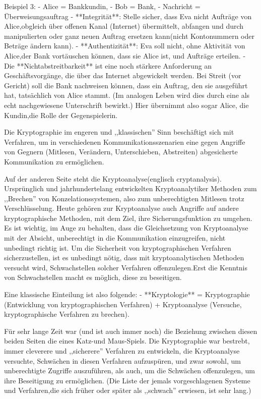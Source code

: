 \documentclass[a4paper]{article}
\begin{document}
\begin{multicols}{3}
    Beispiel 3:
    - Alice = Bankkundin,
    - Bob = Bank,
    - Nachricht = Überweisungsauftrag
    - **Integrität**: Stelle sicher, dass Eva nicht Aufträge von Alice,obgleich über offenen Kanal (Internet) übermittelt, abfangen und durch manipulierten oder ganz neuen Auftrag ersetzen kann(nicht Kontonummern oder Beträge ändern kann).
    - **Authentizität**: Eva soll nicht, ohne Aktivität von Alice,der Bank vortäuschen können, dass sie Alice ist, und Aufträge erteilen.
    - Die **Nichtabstreitbarkeit** ist eine noch stärkere Anforderung an Geschäftsvorgänge, die über das Internet abgewickelt werden. Bei Streit (vor Gericht) soll die Bank nachweisen können, dass ein Auftrag, den sie ausgeführt hat, tatsächlich von Alice stammt. (Im analogen Leben wird dies durch eine als echt nachgewiesene Unterschrift bewirkt.) Hier übernimmt also sogar Alice, die Kundin,die Rolle der Gegenspielerin.

    Die Kryptographie im engeren und ,,klassischen'' Sinn beschäftigt sich mit Verfahren, um in verschiedenen Kommunikationsszenarien eine gegen Angriffe von Gegnern  (Mitlesen, Verändern, Unterschieben, Abstreiten)  abgesicherte Kommunikation zu ermöglichen.

    Auf der anderen Seite steht die Kryptoanalyse(englisch cryptanalysis). Ursprünglich und jahrhundertelang entwickelten Kryptoanalytiker Methoden zum ,,Brechen'' von Konzelationssystemen, also zum unberechtigten Mitlesen trotz Verschlüsselung. Heute gehören zur Kryptoanalyse auch Angriffe auf andere kryptographische Methoden, mit dem Ziel, ihre Sicherungsfunktion zu umgehen. Es ist wichtig, im Auge zu behalten, dass die Gleichsetzung von Kryptoanalyse mit der Absicht, unberechtigt in die Kommunikation einzugreifen, nicht unbedingt richtig ist. Um die Sicherheit von kryptographischen Verfahren sicherzustellen, ist es unbedingt nötig, dass mit kryptoanalytischen Methoden versucht wird, Schwachstellen solcher Verfahren offenzulegen.Erst die Kenntnis von Schwachstellen macht es möglich, diese zu beseitigen.

    Eine klassische Einteilung ist also folgende:
    - **Kryptologie** = Kryptographie  (Entwicklung von kryptographischen Verfahren) + Kryptoanalyse (Versuche, kryptographische Verfahren zu brechen).

    Für sehr lange Zeit war (und ist auch immer noch) die Beziehung zwischen diesen beiden Seiten die eines Katz-und Maus-Spiels. Die Kryptographie war bestrebt, immer cleverere und ,,sicherere'' Verfahren zu entwickeln, die Kryptoanalyse versuchte, Schwächen in diesen Verfahren aufzuspüren, und zwar sowohl, um unberechtigte Zugriffe auszuführen, als auch, um die Schwächen offenzulegen, um ihre Beseitigung zu ermöglichen. (Die Liste der jemals vorgeschlagenen Systeme und Verfahren,die sich früher oder später als ,,schwach'' erwiesen, ist sehr lang.)


\end{multicols}
\end{document}
